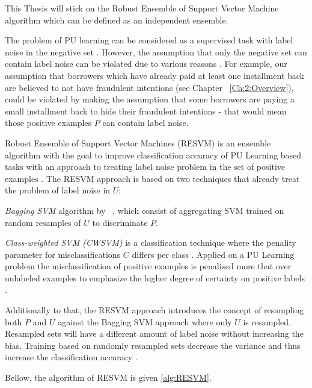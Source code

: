 This Thesis will stick on the Robust Ensemble of Support Vector Machine algorithm \cite{Claesen:2014} which can be defined as an independent ensemble.

The problem of PU learning can be considered as a supervised task with label noise in the negative set \cite{Claesen:2014}. However, the assumption that only the negative set can contain label noise can be violated due to various reasons \cite{journals/tnn/FrenayV14}. For example, our assumption that borrowers which have already paid at least one installment back are believed to not have fraudulent intentions (see Chapter ~\ref{Ch:2:Overview}), could be violated by making the assumption that some borrowers are paying a small installment back to hide their fraudulent intentions - that would mean those positive examples \(P\) can contain label noise.

Robust Ensemble of Support Vector Machines (RESVM) is an ensemble algorithm with the goal to improve classification accuracy of PU Learning based tasks with an approach to treating label noise problem in the set of positive examples \cite{Claesen:2014}. The RESVM approach is based on two techniques that already treat the problem of label noise in \(U\):

\textit{Bagging SVM} algorithm by ~\cite{journals/prl/MordeletV14}, which consist of aggregating SVM trained on random resamples of \(U\) to discriminate \(P\). 

\textit{Class-weighted SVM (CWSVM)} is a classification technique where the penality parameter for misclassifications \(C\) differs per class \cite{conf/icdm/LiuDLLY03}. Applied on a PU Learning problem the misclassification of positive examples is penalized more that over unlabeled examples to emphasize the higher degree of certainty on positive labels \cite{Claesen:2014}.

Additionally to that, the RESVM approach introduces the concept of resampling both \(P\) and \(U\) against the Bagging SVM approach where only \(U\) is resampled. Resampled sets will have a different amount of label noise without increasing the bias. Training based on randomly resampled sets decrease the variance and thus increase the classification accuracy \cite{journals/ml/Breiman00}.

Bellow, the algorithm of RESVM is given \ref{alg:RESVM}.

